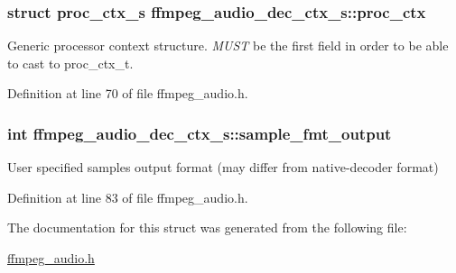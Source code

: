 \subsubsection[{\texorpdfstring{proc\+\_\+ctx}{proc_ctx}}]{\setlength{\rightskip}{0pt plus 5cm}struct {\bf proc\+\_\+ctx\+\_\+s} ffmpeg\+\_\+audio\+\_\+dec\+\_\+ctx\+\_\+s\+::proc\+\_\+ctx}\hypertarget{structffmpeg__audio__dec__ctx__s_a7d595b487c31ee5bd9b809bfb0403c5e}{}\label{structffmpeg__audio__dec__ctx__s_a7d595b487c31ee5bd9b809bfb0403c5e}
Generic processor context structure. {\itshape M\+U\+ST} be the first field in order to be able to cast to proc\+\_\+ctx\+\_\+t. 

Definition at line 70 of file ffmpeg\+\_\+audio.\+h.

\subsubsection[{\texorpdfstring{sample\+\_\+fmt\+\_\+output}{sample_fmt_output}}]{\setlength{\rightskip}{0pt plus 5cm}int ffmpeg\+\_\+audio\+\_\+dec\+\_\+ctx\+\_\+s\+::sample\+\_\+fmt\+\_\+output}\hypertarget{structffmpeg__audio__dec__ctx__s_a02c7c9203da4242a4e088ac6cc4c304d}{}\label{structffmpeg__audio__dec__ctx__s_a02c7c9203da4242a4e088ac6cc4c304d}
User specified samples output format (may differ from native-\/decoder format) 

Definition at line 83 of file ffmpeg\+\_\+audio.\+h.



The documentation for this struct was generated from the following file\+:\begin{DoxyCompactItemize}
\item 
\hyperlink{ffmpeg__audio_8h}{ffmpeg\+\_\+audio.\+h}\end{DoxyCompactItemize}
